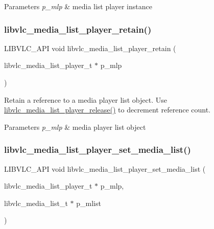 \begin{DoxyParams}{Parameters}
{\em p\+\_\+mlp} & media list player instance \\
\hline
\end{DoxyParams}
\mbox{\label{group__libvlc__media__list__player_ga322f8fd8487aef71d0d914ca57e59bf6}} 
\subsubsection{\texorpdfstring{libvlc\+\_\+media\+\_\+list\+\_\+player\+\_\+retain()}{libvlc\_media\_list\_player\_retain()}}
{\footnotesize\ttfamily L\+I\+B\+V\+L\+C\+\_\+\+A\+PI void libvlc\+\_\+media\+\_\+list\+\_\+player\+\_\+retain (\begin{DoxyParamCaption}\item[{libvlc\+\_\+media\+\_\+list\+\_\+player\+\_\+t $\ast$}]{p\+\_\+mlp }\end{DoxyParamCaption})}

Retain a reference to a media player list object. Use \hyperlink{group__libvlc__media__list__player_ga50768b609de18646d8339c31bd57d41d}{libvlc\+\_\+media\+\_\+list\+\_\+player\+\_\+release()} to decrement reference count.


\begin{DoxyParams}{Parameters}
{\em p\+\_\+mlp} & media player list object \\
\hline
\end{DoxyParams}
\mbox{\label{group__libvlc__media__list__player_ga81289f13efd011a195f1728a12e348db}} 
\subsubsection{\texorpdfstring{libvlc\+\_\+media\+\_\+list\+\_\+player\+\_\+set\+\_\+media\+\_\+list()}{libvlc\_media\_list\_player\_set\_media\_list()}}
{\footnotesize\ttfamily L\+I\+B\+V\+L\+C\+\_\+\+A\+PI void libvlc\+\_\+media\+\_\+list\+\_\+player\+\_\+set\+\_\+media\+\_\+list (\begin{DoxyParamCaption}\item[{libvlc\+\_\+media\+\_\+list\+\_\+player\+\_\+t $\ast$}]{p\+\_\+mlp,  }\item[{libvlc\+\_\+media\+\_\+list\+\_\+t $\ast$}]{p\+\_\+mlist }\end{DoxyParamCaption})}

